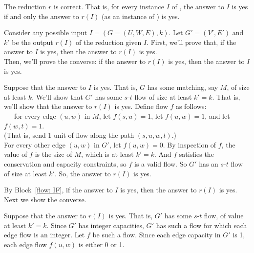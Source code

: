 \begin{lemma}
  The reduction $r$ is correct.  That is, for every instance $I$ of ,
  the answer to $I$ is \textsf{yes} if and only the answer to $r(I)$ (as an instance of )
  is  \textsf{yes}.
\end{lemma}
\begin{longFormProof}
  \step Consider any possible input $I=(G=(U, W, E), k)$.  
  \step Let $G'=(V', E')$ and $k'$ be the output $r(I)$ of the reduction given $I$.
  \step First, we'll prove that, if the answer to $I$ is \textsf{yes},
  then the answer to $r(I)$ is \textsf{yes}.
  \\
  Then, we'll prove the converse: 
  if the answer to $r(I)$ is \textsf{yes},
  then the answer to $I$ is \textsf{yes}.
  \smallskip
  \begin{block}[flow: IF]
    \step Suppose that the answer to $I$ is \textsf{yes}.  
    \step That is, $G$ has some matching, say $M$, of size at least $k$.
    \step We'll show that $G'$ has some $s$-$t$ flow of size at least $k'=k$.
    \step That is, we'll show that the answer to $r(I)$ is \textsf{yes}. 
    \step Define flow $f$ as follows:
    \\~~~for every edge $(u,w)$ in $M$,
    let $f(s, u) = 1$,
    let $f(u, w) = 1$,
    and 
    let $f(w, t) = 1$.
    \\ (That is, send 1 unit of flow along the path $(s, u, w, t)$.)
    \\ For every other edge $(u, w)$ in $G'$, let $f(u, w) = 0$.
    \step By inspection of $f$, the value of $f$ is the size of $M$, which is at least $k'=k$.
    \step And $f$ satisfies the conservation and capacity constraints, so $f$ is a valid flow.
    \step So $G'$ has an $s$-$t$ flow of size at least $k'$.
    \step So, the answer to $r(I)$ is \textsf{yes}.
  \end{block}
  \step[flow: IF2] By Block~\ref{flow: IF}, if the answer to $I$ is \textsf{yes}, then the answer to $r(I)$ is \textsf{yes}.
  \medskip
  \step Next we show the converse.
  \begin{block}
    \step Suppose that the answer to $r(I)$ is \textsf{yes}. 
    \step That is, $G'$ has some $s$-$t$ flow, of value at least $k'=k$.
    \step Since $G'$ has integer capacities, $G'$ has such a flow for which each edge flow is an integer.
    \step Let $f$ be such a flow.
     Since each edge capacity in $G'$ is 1, each edge flow $f(u,w)$ is either 0 or 1.

\end{block}
\end{longFormProof}
